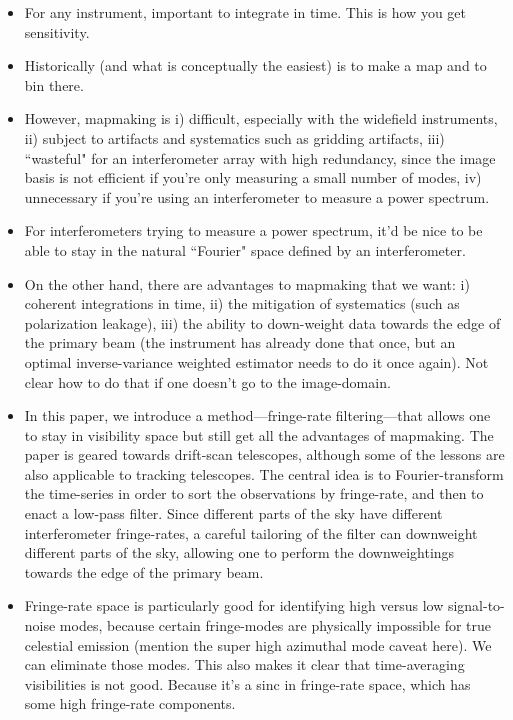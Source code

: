 \documentclass[twocolumn,apj,numberedappendix]{emulateapj}
\begin{document}
\begin{itemize}
\item For any instrument, important to integrate in time.  This is how you get sensitivity.
\item Historically (and what is conceptually the easiest) is to make a map and to bin there.
\item However, mapmaking is i) difficult, especially with the widefield instruments, ii) subject to artifacts and systematics such as gridding artifacts, iii) ``wasteful" for an interferometer array with high redundancy, since the image basis is not efficient if you're only measuring a small number of modes, iv) unnecessary if you're using an interferometer to measure a power spectrum.
\item For interferometers trying to measure a power spectrum, it'd be nice to be able to stay in the natural ``Fourier" space defined by an interferometer.
\item On the other hand, there are advantages to mapmaking that we want: i) coherent integrations in time, ii) the mitigation of systematics (such as polarization leakage), iii) the ability to down-weight data towards the edge of the primary beam (the instrument has already done that once, but an optimal inverse-variance weighted estimator needs to do it once again).  Not clear how to do that if one doesn't go to the image-domain.
\item In this paper, we introduce a method---fringe-rate filtering---that allows one to stay in visibility space but still get all the advantages of mapmaking.  The paper is geared towards drift-scan telescopes, although some of the lessons are also applicable to tracking telescopes.  The central idea is to Fourier-transform the time-series in order to sort the observations by fringe-rate, and then to enact a low-pass filter.  Since different parts of the sky have different interferometer fringe-rates, a careful tailoring of the filter can downweight different parts of the sky, allowing one to perform the downweightings towards the edge of the primary beam.
\item Fringe-rate space is particularly good for identifying high versus low signal-to-noise modes, because certain fringe-modes are physically impossible for true celestial emission (mention the super high azimuthal mode caveat here).  We can eliminate those modes.  This also makes it clear that time-averaging visibilities is not good.  Because it's a sinc in fringe-rate space, which has some high fringe-rate components.


\end{itemize}
\end{document}
